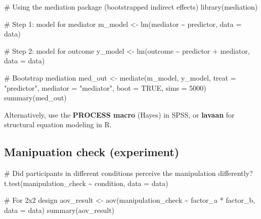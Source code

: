 \documentclass[
  11pt,
  a4paper,
]{scrbook}
\newenvironment{Shaded}{\begin{snugshade}}{\end{snugshade}}
\newcommand{\AttributeTok}[1]{\textcolor[rgb]{0.40,0.45,0.13}{#1}}
\newcommand{\CommentTok}[1]{\textcolor[rgb]{0.37,0.37,0.37}{#1}}
\newcommand{\ConstantTok}[1]{\textcolor[rgb]{0.56,0.35,0.01}{#1}}
\newcommand{\DecValTok}[1]{\textcolor[rgb]{0.68,0.00,0.00}{#1}}
\newcommand{\FunctionTok}[1]{\textcolor[rgb]{0.28,0.35,0.67}{#1}}
\newcommand{\NormalTok}[1]{\textcolor[rgb]{0.00,0.23,0.31}{#1}}
\newcommand{\OtherTok}[1]{\textcolor[rgb]{0.00,0.23,0.31}{#1}}
\newcommand{\SpecialCharTok}[1]{\textcolor[rgb]{0.37,0.37,0.37}{#1}}
\newcommand{\StringTok}[1]{\textcolor[rgb]{0.13,0.47,0.30}{#1}}
\begin{document}
\begin{Shaded}
\begin{Highlighting}[]
\CommentTok{\# Using the \textquotesingle{}mediation\textquotesingle{} package (bootstrapped indirect effects)}
\FunctionTok{library}\NormalTok{(mediation)}

\CommentTok{\# Step 1: model for mediator}
\NormalTok{m\_model }\OtherTok{\textless{}{-}} \FunctionTok{lm}\NormalTok{(mediator }\SpecialCharTok{\textasciitilde{}}\NormalTok{ predictor, }\AttributeTok{data =}\NormalTok{ data)}

\CommentTok{\# Step 2: model for outcome}
\NormalTok{y\_model }\OtherTok{\textless{}{-}} \FunctionTok{lm}\NormalTok{(outcome }\SpecialCharTok{\textasciitilde{}}\NormalTok{ predictor }\SpecialCharTok{+}\NormalTok{ mediator, }\AttributeTok{data =}\NormalTok{ data)}

\CommentTok{\# Bootstrap mediation}
\NormalTok{med\_out }\OtherTok{\textless{}{-}} \FunctionTok{mediate}\NormalTok{(m\_model, y\_model,}
                   \AttributeTok{treat =} \StringTok{"predictor"}\NormalTok{, }\AttributeTok{mediator =} \StringTok{"mediator"}\NormalTok{,}
                   \AttributeTok{boot =} \ConstantTok{TRUE}\NormalTok{, }\AttributeTok{sims =} \DecValTok{5000}\NormalTok{)}
\FunctionTok{summary}\NormalTok{(med\_out)}
\end{Highlighting}
\end{Shaded}

Alternatively, use the \textbf{PROCESS macro} (Hayes) in SPSS, or
\textbf{lavaan} for structural equation modeling in R.

\subsection{Manipuation check
(experiment)}\label{manipuation-check-experiment}

\begin{Shaded}
\begin{Highlighting}[]
\CommentTok{\# Did participants in different conditions perceive the manipulation differently?}
\FunctionTok{t.test}\NormalTok{(manipulation\_check }\SpecialCharTok{\textasciitilde{}}\NormalTok{ condition, }\AttributeTok{data =}\NormalTok{ data)}

\CommentTok{\# For 2x2 design}
\NormalTok{aov\_result }\OtherTok{\textless{}{-}} \FunctionTok{aov}\NormalTok{(manipulation\_check }\SpecialCharTok{\textasciitilde{}}\NormalTok{ factor\_a }\SpecialCharTok{*}\NormalTok{ factor\_b, }\AttributeTok{data =}\NormalTok{ data)}
\FunctionTok{summary}\NormalTok{(aov\_result)}
\end{Highlighting}
\end{Shaded}
\end{document}
